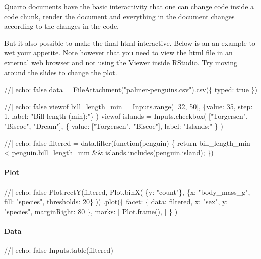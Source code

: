 \documentclass[
  letterpaper,
  DIV=11,
  numbers=noendperiod]{scrartcl}
\let\oldparagraph\paragraph
\renewcommand{\paragraph}[1]{\oldparagraph{#1}\mbox{}}
\newenvironment{Shaded}{\begin{snugshade}}{\end{snugshade}}
\newcommand{\NormalTok}[1]{\textcolor[rgb]{0.00,0.23,0.31}{#1}}
\begin{document}
Quarto documents have the basic interactivity that one can change code
inside a code chunk, render the document and everything in the document
changes according to the changes in the code.

\hfill\break
But it also possible to make the final html interactive. Below is an an
example to wet your appetite. Note however that you need to view the
html file in an external web browser and not using the Viewer inside
RStudio. Try moving around the slides to change the plot.

\begin{Shaded}
\begin{Highlighting}[]
\NormalTok{//| echo: false}
\NormalTok{data = FileAttachment("palmer{-}penguins.csv").csv(\{ typed: true \})}
\end{Highlighting}
\end{Shaded}

\begin{Shaded}
\begin{Highlighting}[]
\NormalTok{//| echo: false}
\NormalTok{viewof bill\_length\_min = Inputs.range(}
\NormalTok{  [32, 50], }
\NormalTok{  \{value: 35, step: 1, label: "Bill length (min):"\}}
\NormalTok{)}
\NormalTok{viewof islands = Inputs.checkbox(}
\NormalTok{  ["Torgersen", "Biscoe", "Dream"], }
\NormalTok{  \{ value: ["Torgersen", "Biscoe"], }
\NormalTok{    label: "Islands:"}
\NormalTok{  \}}
\NormalTok{)}
\end{Highlighting}
\end{Shaded}

\begin{Shaded}
\begin{Highlighting}[]
\NormalTok{//| echo: false}
\NormalTok{filtered = data.filter(function(penguin) \{}
\NormalTok{  return bill\_length\_min \textless{} penguin.bill\_length\_mm \&\&}
\NormalTok{         islands.includes(penguin.island);}
\NormalTok{\})}
\end{Highlighting}
\end{Shaded}

\hypertarget{plot}{%
\paragraph{Plot}\label{plot}}

\begin{Shaded}
\begin{Highlighting}[]
\NormalTok{//| echo: false}
\NormalTok{Plot.rectY(filtered, }
\NormalTok{  Plot.binX(}
\NormalTok{    \{y: "count"\}, }
\NormalTok{    \{x: "body\_mass\_g", fill: "species", thresholds: 20\}}
\NormalTok{  ))}
\NormalTok{  .plot(\{}
\NormalTok{    facet: \{}
\NormalTok{      data: filtered,}
\NormalTok{      x: "sex",}
\NormalTok{      y: "species",}
\NormalTok{      marginRight: 80}
\NormalTok{    \},}
\NormalTok{    marks: [}
\NormalTok{      Plot.frame(),}
\NormalTok{    ]}
\NormalTok{  \}}
\NormalTok{)}
\end{Highlighting}
\end{Shaded}

\hypertarget{data}{%
\paragraph{Data}\label{data}}

\begin{Shaded}
\begin{Highlighting}[]
\NormalTok{//| echo: false}
\NormalTok{Inputs.table(filtered)}
\end{Highlighting}
\end{Shaded}
\end{document}
